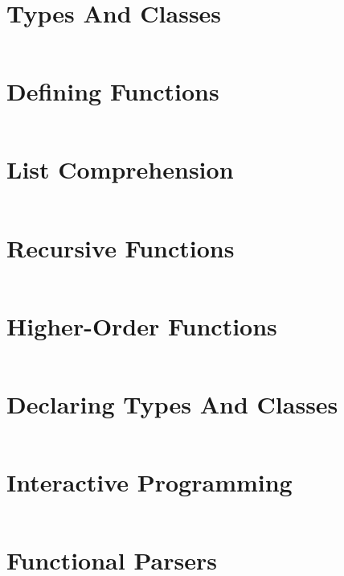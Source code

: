 \documentclass[a4paper,9pt,twoside]{book}
\newcommand{\hsfile}[1]{\inputminted[breaklines]{haskell}{../haskell/#1.hs}}
\begin{document}
\section{Types And Classes}
\hsfile{slides/2_types_and_classes}
\section{Defining Functions}
\hsfile{slides/3_defining_functions}
\section{List Comprehension}
\hsfile{slides/4_list_comprehension}
\section{Recursive Functions}
\hsfile{slides/5_recursive_functions}
\section{Higher-Order Functions}
\hsfile{slides/6_higher-order_functions}
\section{Declaring Types And Classes}
\hsfile{slides/7_declaring_types_and_classes}
\section{Interactive Programming}
\hsfile{slides/8_interactive_programming}
\section{Functional Parsers}
\hsfile{slides/9_functional_parsers}
\end{document}
